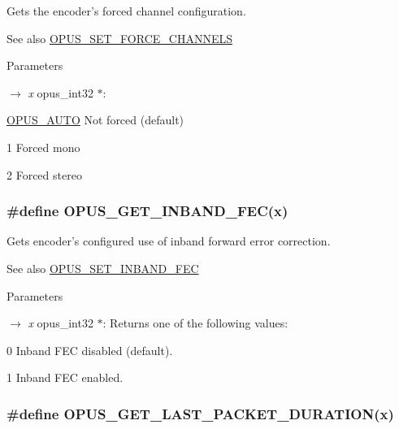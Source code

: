 Gets the encoder's forced channel configuration. \begin{DoxySeeAlso}{See also}
\hyperlink{group__opus__encoderctls_ga8450a745bd919a8de522afec115f3b5f}{OPUS\_\-SET\_\-FORCE\_\-CHANNELS} 
\end{DoxySeeAlso}

\begin{DoxyParams}{Parameters}
\item[\mbox{$\rightarrow$} {\em x}]{\ttfamily opus\_\-int32 $\ast$}: 
\begin{DoxyDescription}
\item[\hyperlink{group__opus__ctlvalues_ga1c5b3244b018ff4548d2d6bffa418472}{OPUS\_\-AUTO}]Not forced (default) 
\item[1 ]Forced mono 
\item[2 ]Forced stereo 
\end{DoxyDescription}\end{DoxyParams}
\hypertarget{group__opus__encoderctls_gaf792b27a6277ddf786413dbf472d0ac8}{
\subsubsection[{OPUS\_\-GET\_\-INBAND\_\-FEC}]{\setlength{\rightskip}{0pt plus 5cm}\#define OPUS\_\-GET\_\-INBAND\_\-FEC(x)}}
\label{group__opus__encoderctls_gaf792b27a6277ddf786413dbf472d0ac8}


Gets encoder's configured use of inband forward error correction. \begin{DoxySeeAlso}{See also}
\hyperlink{group__opus__encoderctls_ga5b67dc832aa46c1c2f35752c46380545}{OPUS\_\-SET\_\-INBAND\_\-FEC} 
\end{DoxySeeAlso}

\begin{DoxyParams}{Parameters}
\item[\mbox{$\rightarrow$} {\em x}]{\ttfamily opus\_\-int32 $\ast$}: Returns one of the following values: 
\begin{DoxyDescription}
\item[0]Inband FEC disabled (default). 
\item[1]Inband FEC enabled. 
\end{DoxyDescription}\end{DoxyParams}
\hypertarget{group__opus__encoderctls_ga8f3d070f56b75f2a7af54e5776b387fa}{
\subsubsection[{OPUS\_\-GET\_\-LAST\_\-PACKET\_\-DURATION}]{\setlength{\rightskip}{0pt plus 5cm}\#define OPUS\_\-GET\_\-LAST\_\-PACKET\_\-DURATION(x)}}
\label{group__opus__encoderctls_ga8f3d070f56b75f2a7af54e5776b387fa}


